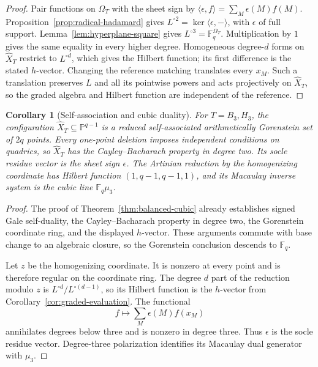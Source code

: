 \documentclass[11pt]{article}
\newtheorem{corollary}[theorem]{Corollary}
\theoremstyle{definition}
\theoremstyle{remark}
\newcommand{\F}{\mathbb{F}}
\begin{document}
\begin{proof}
Pair functions on \(\Omega_T\) with the sheet sign by
\(\langle\epsilon,f\rangle=\sum_M\epsilon(M)f(M)\).
Proposition~\ref{prop:radical-hadamard} gives
\(L^{\circ2}=\ker\langle\epsilon,-\rangle\), with \(\epsilon\) of full
support.  Lemma~\ref{lem:hyperplane-square} gives
\(L^{\circ3}=\F_q^{\Omega_T}\).  Multiplication by \(1\) gives the same
equality in every higher degree.  Homogeneous degree-\(d\) forms on
\(\widehat X_T\) restrict to \(L^{\circ d}\), which gives the Hilbert
function; its first difference is the stated \(h\)-vector.
Changing the reference matching translates every \(x_M\).  Such a
translation preserves \(L\) and all its pointwise powers and acts
projectively on \(\widehat X_T\), so the graded algebra and Hilbert
function are independent of the reference.
\end{proof}

\begin{corollary}[Self-association and cubic duality]
\label{cor:self-associated-gorenstein}
For \(T=B_3,H_3\), the configuration
\(\widehat X_T\subseteq\mathbb P^{q-1}\) is a reduced
self-associated arithmetically Gorenstein set of \(2q\) points.
Every one-point deletion imposes independent conditions on quadrics,
so \(\widehat X_T\) has the Cayley--Bacharach property in degree two.
Its socle residue vector is the sheet sign \(\epsilon\).  The
Artinian reduction by the homogenizing coordinate has Hilbert function
\((1,q-1,q-1,1)\), and its Macaulay inverse system is the cubic line
\(\F_q\mu_3\).
\end{corollary}

\begin{proof}
The proof of Theorem~\ref{thm:balanced-cubic} already establishes signed
Gale self-duality, the Cayley--Bacharach property in degree two, the
Gorenstein coordinate ring, and the displayed \(h\)-vector.  These
arguments commute with base change to an algebraic closure, so the
Gorenstein conclusion descends to \(\F_q\).

Let \(z\) be the homogenizing coordinate.  It is nonzero at every
point and is therefore regular on the coordinate ring.  The degree
\(d\) part of the reduction modulo \(z\) is
\(L^{\circ d}/L^{\circ(d-1)}\), so its Hilbert function is the
\(h\)-vector from Corollary~\ref{cor:graded-evaluation}.  The functional
\[
 f\longmapsto\sum_M\epsilon(M)f(x_M)
\]
annihilates degrees below three and is nonzero in degree three.
Thus \(\epsilon\) is the socle residue vector.  Degree-three
polarization identifies its Macaulay dual generator with \(\mu_3\).
\end{proof}
\end{document}
